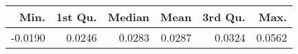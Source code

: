 \begin{table}[ht]
\centering
\begin{tabular}{rrrrrr}
  \hline
Min. & 1st Qu. & Median & Mean & 3rd Qu. & Max. \\ 
  \hline
-0.0190 & 0.0246 & 0.0283 & 0.0287 & 0.0324 & 0.0562 \\ 
   \hline
\end{tabular}
\end{table}
